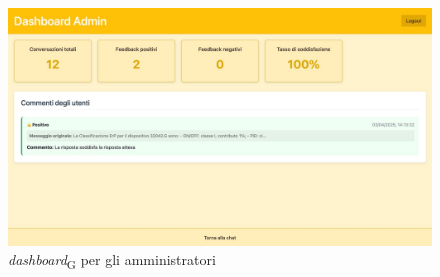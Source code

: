 \begin{figure}[H]
\centering
\includegraphics[width=1\textwidth]{contents/img/dashboard.jpg}
\caption{\textit{dashboard}\textsubscript{G} per gli amministratori}
\end{figure}

